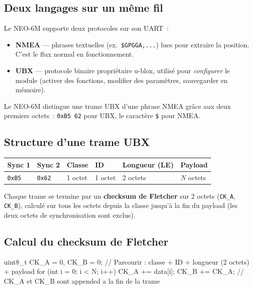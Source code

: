 \documentclass[12pt,a4paper]{article}
\newcommand{\hex}[1]{\texttt{0x#1}}
\newcommand{\code}[1]{\texttt{#1}}
\begin{document}
\subsection{Deux langages sur un m\^eme fil}

Le NEO-6M supporte deux protocoles sur son UART~:

\begin{itemize}
  \item \textbf{NMEA} --- phrases textuelles (ex.~\code{\$GPGGA,...}) lues
        pour extraire la position. C'est le flux normal en fonctionnement.
  \item \textbf{UBX} --- protocole binaire propri\'etaire u-blox, utilis\'e pour
        \emph{configurer} le module (activer des fonctions, modifier des
        param\`etres, sauvegarder en m\'emoire).
\end{itemize}

Le NEO-6M distingue une trame UBX d'une phrase NMEA gr\^ace aux deux premiers
octets~: \hex{B5 62} pour UBX, le caract\`ere \code{\$} pour NMEA.

\subsection{Structure d'une trame UBX}

\begin{center}
\begin{tabular}{C{1.8cm} C{1.8cm} C{2cm} C{2cm} C{2.5cm} C{2.5cm}}
\toprule
\textbf{Sync 1} & \textbf{Sync 2} & \textbf{Classe} & \textbf{ID}
  & \textbf{Longueur (LE)} & \textbf{Payload} \\
\midrule
\hex{B5} & \hex{62} & 1 octet & 1 octet & 2 octets & $N$ octets \\
\bottomrule
\end{tabular}
\end{center}

\medskip
Chaque trame se termine par un \textbf{checksum de Fletcher} sur 2 octets
(\code{CK\_A}, \code{CK\_B}), calcul\'e sur tous les octets depuis la classe
jusqu'\`a la fin du payload (les deux octets de synchronisation sont exclus).

\subsection{Calcul du checksum de Fletcher}

\begin{cppbox}
uint8_t CK_A = 0, CK_B = 0;
// Parcourir : classe + ID + longueur (2 octets) + payload
for (int i = 0; i < N; i++) {
    CK_A += data[i];
    CK_B += CK_A;
}
// CK_A et CK_B sont appended a la fin de la trame
\end{cppbox}
\end{document}
